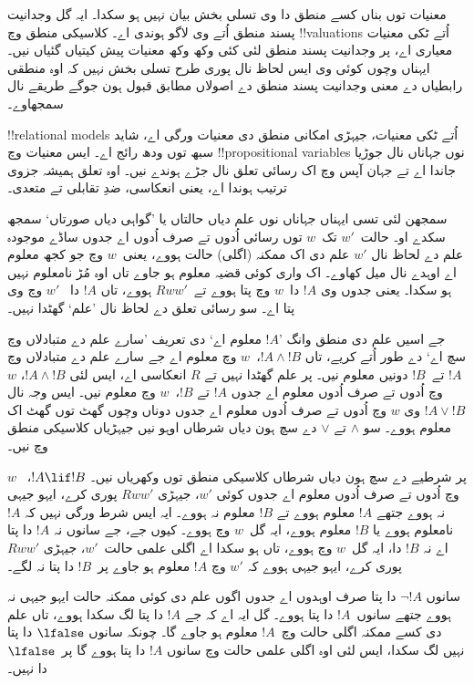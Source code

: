 \documentclass[../../../include/open-logic-section]{subfiles}
\begin{document}


معنیات توں بناں کسے منطق دا وی تسلی بخش بیان نہیں ہو سکدا۔ ایہ گل وجدانیت پسند
منطق اُتے وی لاگو ہوندی اے۔ کلاسیکی منطق وچ !!{valuation}s اُتے ٹکی معنیات
معیاری اے، پر وجدانیت پسند منطق لئی کئی وکھ وکھ معنیات پیش کیتیاں گئیاں نیں۔
ایہناں وچوں کوئی وی ایس لحاظ نال پوری طرح تسلی بخش نہیں کہ اوہ منطقی رابطیاں
دے معنی وجدانیت پسند منطق دے اصولاں مطابق قبول ہون جوگے طریقے نال سمجھاوے۔

!!{relational model}s اُتے ٹکی معنیات، جیہڑی امکانی منطق دی معنیات ورگی اے،
شاید سبھ توں ودھ رائج اے۔ ایس معنیات وچ !!{propositional variable}s نوں جہاناں
نال جوڑیا جاندا اے تے جہان آپس وچ اک رسائی تعلق نال جڑے ہوندے نیں۔
اوہ تعلق ہمیشہ جزوی ترتیب ہوندا اے، یعنی انعکاسی، ضدِ تقابلی تے متعدی۔

سمجھن لئی تسی ایہناں جہاناں نوں علم دیاں حالتاں یا ’گواہی دیاں صورتاں‘ سمجھ سکدے او۔
حالت~$w'$ تک~$w$ توں رسائی اُدوں تے صرف اُدوں اے جدوں ساڈے موجودہ علم دے لحاظ
نال $w'$ علم دی اک ممکنہ (اگلی) حالت ہووے، یعنی~$w$ وچ جو کجھ معلوم اے
اوہدے نال میل کھاوے۔ اک واری کوئی قضیہ معلوم ہو جاوے تاں اوہ مُڑ نامعلوم نہیں
ہو سکدا۔ یعنی جدوں وی $!A$ دا~$w$ وچ پتا ہووے تے~$Rww'$ ہووے، تاں $!A$ دا
~$w'$ وچ وی پتا اے۔ سو رسائی تعلق دے لحاظ نال ’علم‘ گھٹدا نہیں۔

جے اسیں علم دی منطق وانگ ’$!A$ معلوم اے‘ دی تعریف ’سارے علم دے متبادلاں وچ سچ اے‘
دے طور اُتے کریے، تاں $!A \land !B$،~$w$ وچ معلوم اے جے سارے علم دے متبادلاں وچ
$!A$ تے~$!B$ دونیں معلوم نیں۔ پر علم گھٹدا نہیں تے $R$ انعکاسی اے، ایس لئی
$!A \land !B$، $w$ وچ اُدوں تے صرف اُدوں معلوم اے جدوں $!A$ تے $!B$،~$w$
وچ معلوم نیں۔ ایس وجہ نال $!A \lor !B$ وی $w$ وچ اُدوں تے صرف اُدوں معلوم
اے جدوں دوناں وچوں گھٹ توں گھٹ اک معلوم ہووے۔ سو $\land$ تے $\lor$ دے سچ ہون
دیاں شرطاں اوہو نیں جیہڑیاں کلاسیکی منطق وچ نیں۔

پر شرطیے دے سچ ہون دیاں شرطاں کلاسیکی منطق توں وکھریاں نیں۔ $!A \lif !B$،
~$w$ وچ اُدوں تے صرف اُدوں معلوم اے جدوں کوئی $w'$، جیہڑی $Rww'$ پوری کرے، ایہو جیہی
نہ ہووے جتھے $!A$ معلوم ہووے تے $!B$ معلوم نہ ہووے۔ ایہ ایس شرط ورگی نہیں
کہ $!A$ نامعلوم ہووے یا $!B$ معلوم ہووے، ایہ گل~$w$ وچ ہووے۔ کیوں جے، جے سانوں نہ $!A$ دا پتا اے نہ $!B$ دا، ایہ گل~$w$ وچ ہووے، تاں ہو سکدا اے اگلی علمی حالت~$w'$، جیہڑی $Rww'$ پوری کرے، ایہو جیہی ہووے کہ $w'$ وچ $!A$ معلوم ہو جاوے پر~$!B$ دا پتا نہ لگے۔

سانوں $\lnot !A$ دا پتا صرف اوہدوں اے جدوں اگوں علم دی کوئی ممکنہ حالت
ایہو جیہی نہ ہووے جتھے سانوں~$!A$ دا پتا ہووے۔ گل ایہ اے کہ جے $!A$ دا
پتا لگ سکدا ہووے، تاں علم دی کسے ممکنہ اگلی حالت وچ~$!A$ معلوم ہو جاوے گا۔
چونکہ سانوں $\lfalse$ دا پتا نہیں لگ سکدا، ایس لئی اوہ اگلی علمی حالت وچ
سانوں $!A$ دا پتا ہووے گا پر~$\lfalse$ دا نہیں۔
\end{document}

